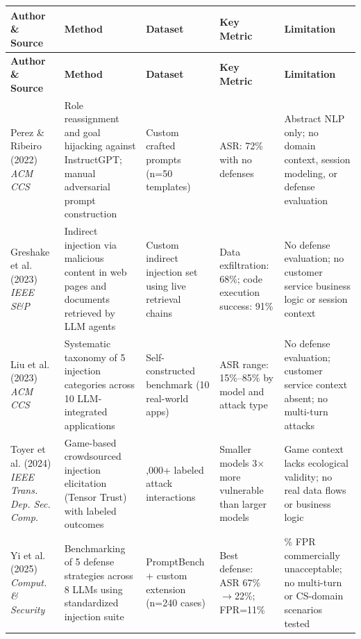 \documentclass[12pt,a4paper]{article}
\begin{document}
\begin{longtable}{>{\raggedright\arraybackslash}p{2.5cm} >{\raggedright\arraybackslash}p{3.5cm} >{\raggedright\arraybackslash}p{3cm} >{\raggedright\arraybackslash}p{3cm} >{\raggedright\arraybackslash}p{3.5cm}}
\toprule
\textbf{Author \& Source} & \textbf{Method} & \textbf{Dataset} & \textbf{Key Metric} & \textbf{Limitation} \\
\midrule
\endfirsthead
\toprule
\textbf{Author \& Source} & \textbf{Method} & \textbf{Dataset} & \textbf{Key Metric} & \textbf{Limitation} \\
\midrule
\endhead
\bottomrule
\endfoot
\bottomrule
\endlastfoot

Perez \& Ribeiro (2022) \cite{perez2022} \newline \textit{ACM CCS} & Role reassignment and goal hijacking against InstructGPT; manual adversarial prompt construction & Custom crafted prompts (n=50 templates) & ASR: 72\% with no defenses & Abstract NLP only; no domain context, session modeling, or defense evaluation \\
\midrule
Greshake et al. (2023) \cite{greshake2023} \newline \textit{IEEE S\&P} & Indirect injection via malicious content in web pages and documents retrieved by LLM agents & Custom indirect injection set using live retrieval chains & Data exfiltration: 68\%; code execution success: 91\% & No defense evaluation; no customer service business logic or session context \\
\midrule
Liu et al. (2023) \cite{liu2023} \newline \textit{ACM CCS} & Systematic taxonomy of 5 injection categories across 10 LLM-integrated applications & Self-constructed benchmark (10 real-world apps) & ASR range: 15\%–85\% by model and attack type & No defense evaluation; customer service context absent; no multi-turn attacks \\
\midrule
Toyer et al. (2024) \cite{toyer2024} \newline \textit{IEEE Trans. Dep. Sec. Comp.} & Game-based crowdsourced injection elicitation (Tensor Trust) with labeled outcomes & 126,000+ labeled attack interactions & Smaller models 3$\times$ more vulnerable than larger models & Game context lacks ecological validity; no real data flows or business logic \\
\midrule
Yi et al. (2025) \cite{yi2025} \newline \textit{Comput. \& Security} & Benchmarking of 5 defense strategies across 8 LLMs using standardized injection suite & PromptBench + custom extension (n=240 cases) & Best defense: ASR 67\%$\rightarrow$22\%; FPR=11\% & 11\% FPR commercially unacceptable; no multi-turn or CS-domain scenarios tested \\
\end{longtable}
\end{document}
